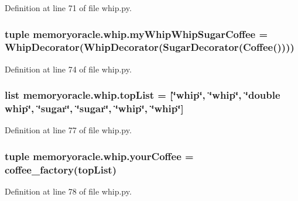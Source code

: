 Definition at line 71 of file whip.\+py.

\hypertarget{namespacememoryoracle_1_1whip_a016df199d94ab221fd5793992d1209af}{}
\subsubsection[{my\+Whip\+Whip\+Sugar\+Coffee}]{\setlength{\rightskip}{0pt plus 5cm}tuple memoryoracle.\+whip.\+my\+Whip\+Whip\+Sugar\+Coffee = {\bf Whip\+Decorator}({\bf Whip\+Decorator}({\bf Sugar\+Decorator}({\bf Coffee}())))}\label{namespacememoryoracle_1_1whip_a016df199d94ab221fd5793992d1209af}


Definition at line 74 of file whip.\+py.

\hypertarget{namespacememoryoracle_1_1whip_ae603092dfc18fbff7a0452dd92457ec6}{}
\subsubsection[{top\+List}]{\setlength{\rightskip}{0pt plus 5cm}list memoryoracle.\+whip.\+top\+List = \mbox{[}\char`\"{}whip\char`\"{}, \char`\"{}whip\char`\"{}, \char`\"{}double whip\char`\"{}, \char`\"{}sugar\char`\"{}, \char`\"{}sugar\char`\"{}, \char`\"{}whip\char`\"{}, \char`\"{}whip\char`\"{}\mbox{]}}\label{namespacememoryoracle_1_1whip_ae603092dfc18fbff7a0452dd92457ec6}


Definition at line 77 of file whip.\+py.

\hypertarget{namespacememoryoracle_1_1whip_a9008ef35cee0e5d2fe14e842629ee8e3}{}
\subsubsection[{your\+Coffee}]{\setlength{\rightskip}{0pt plus 5cm}tuple memoryoracle.\+whip.\+your\+Coffee = {\bf coffee\+\_\+factory}({\bf top\+List})}\label{namespacememoryoracle_1_1whip_a9008ef35cee0e5d2fe14e842629ee8e3}


Definition at line 78 of file whip.\+py.

